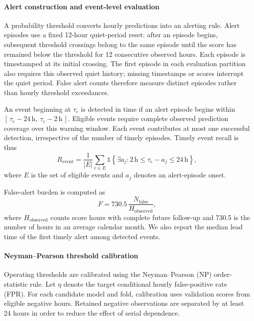 \documentclass[a4paper,fleqn]{cas-sc}
\begin{document}
\paragraph{Alert construction and event-level evaluation}

A probability threshold converts hourly predictions into an alerting
rule. Alert episodes use a fixed 12-hour quiet-period reset: after an
episode begins, subsequent threshold crossings belong to the same
episode until the score has remained below the threshold for
12 consecutive observed hours. Each episode is timestamped at its
initial crossing. The first episode in each evaluation partition
also requires this observed quiet history; missing timestamps or
scores interrupt the quiet period. False alert counts therefore measure distinct episodes rather than hourly threshold exceedances.

An event beginning at $\tau_e$ is detected in time if an alert episode
begins within $[\,\tau_e-24\,\mathrm{h},\ \tau_e-2\,\mathrm{h}\,]$.
Eligible events require complete observed prediction coverage over
this warning window. Each event contributes at most one successful
detection, irrespective of the number of timely episodes. Timely
event recall is thus
\begin{equation}
    R_{\mathrm{event}}
    =
    \frac{1}{|E|}
    \sum_{e\in E}
    \mathbb{1}\!\left\{
        \exists a_j:
        2\,\mathrm{h}\leq\tau_e-a_j\leq24\,\mathrm{h}
    \right\},
    \label{eq:timely_event_recall}
\end{equation}
where $E$ is the set of eligible events and $a_j$ denotes an
alert-episode onset.

False-alert burden is computed as
\begin{equation}
    F
    =
    730.5\,
    \frac{N_{\mathrm{false}}}{H_{\mathrm{observed}}},
    \label{eq:false_alert_burden}
\end{equation}
where $H_{\mathrm{observed}}$ counts score hours with complete future
follow-up and 730.5 is the number of hours in an average calendar
month. We also report the median lead time of the first timely alert among detected events.

\paragraph{Neyman--Pearson threshold calibration}

Operating thresholds are calibrated using the Neyman--Pearson (NP) \citep{neyman1933}
order-statistic rule. Let $\eta$ denote the target conditional hourly false-positive rate (FPR). For each candidate model and fold, calibration uses validation scores from eligible negative hours. Retained negative observations are separated by at least 24 hours in order to reduce the effect of serial dependence.
\end{document}
